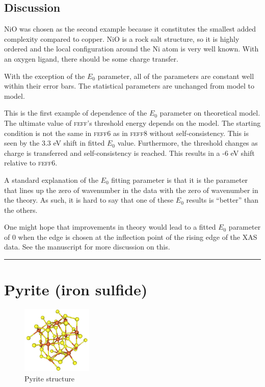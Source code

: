 \documentclass[11pt]{article}
\begin{document}
\subsection{Discussion}
\label{sec:orgheadline12}

NiO was chosen as the second example because it constitutes the smallest
added complexity compared to copper. NiO is a rock salt structure, so it
is highly ordered and the local configuration around the Ni atom is very
well known. With an oxygen ligand, there should be some charge transfer.

With the exception of the $E_0$ parameter, all of the parameters are
constant well within their error bars. The statistical parameters are
unchanged from model to model.

This is the first example of dependence of the $E_0$ parameter on
theoretical model. The ultimate value of \textsc{feff}'s threshold
energy depends on the model. The starting condition is not the same in
\textsc{feff6} as in \textsc{feff8} without self-consistency. This is
seen by the 3.3 eV shift in fitted $E_0$ value. Furthermore, the
threshold changes as charge is transferred and self-consistency is
reached. This results in a -6 eV shift relative to \textsc{feff6}.

A standard explanation of the $E_0$ fitting parameter is that it is the
parameter that lines up the zero of wavenumber in the data with the
zero of wavenumber in the theory. As such, it is hard to say that one
of these $E_0$ results is ``better'' than the others.

One might hope that improvements in theory would lead to a fitted $E_0$
parameter of 0 when the edge is chosen at the inflection point of the
rising edge of the XAS data.  See the manuscript for more discussion
on this.

\rule{\linewidth}{0.5pt}
\pagebreak

\section{Pyrite (iron sulfide)}
\label{sec:orgheadline19}

\begin{figure}
  \begin{center}
    \includegraphics[width=0.3\textwidth]{FeS2/FeS2.png}
  \end{center}
  \caption{Pyrite structure}
\end{figure}
\end{document}
